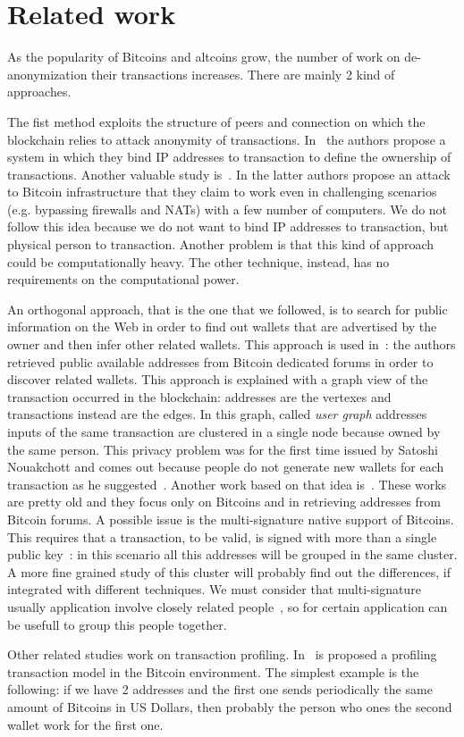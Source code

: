 \section{Related work}
As the popularity of Bitcoins and altcoins grow, the number of work on
de-anonymization their transactions increases.
There are mainly 2 kind of approaches.

The fist method exploits the structure of peers and connection on which the
blockchain relies to attack anonymity of transactions. In~\cite{anonBitcoin}
the authors propose a system in which they bind IP addresses to transaction to
define the ownership of transactions. Another valuable study
is~\cite{deanonP2P}. In the latter authors propose an attack to Bitcoin
infrastructure that they claim to work even in challenging scenarios (e.g.
bypassing firewalls and NATs) with a few number of computers. We do not follow
this idea because we do not want to bind IP addresses to transaction, but
physical person to transaction. Another problem is that this kind of approach
could be computationally heavy. The other technique, instead, has no
requirements on the computational power.

An orthogonal approach, that is the one that we followed, is to search for
public information on the Web in order to find out wallets that are advertised
by the owner and then infer other related wallets. This approach is used
in~\cite{anonAnalysis}: the authors retrieved public available addresses from
Bitcoin dedicated forums in order to discover related wallets. This approach is
explained with a graph view of the transaction occurred in the blockchain:
addresses are the vertexes and transactions instead are the edges. In this
graph, called \textit{user graph} addresses inputs of the same transaction are
clustered in a single node because owned by the same person. This privacy
problem was for the first time issued by Satoshi Nouakchott and comes out
because people do not generate new wallets for each transaction as he
suggested~\cite{satoshi}. Another work based on that idea is~\cite{fistful}.
These works are pretty old and they focus only on Bitcoins and in retrieving
addresses from Bitcoin forums. A possible issue is the multi-signature native
support of Bitcoins. This requires that a transaction, to be valid, is signed
with more than a single public key~\cite{multisignature}: in this scenario all
this addresses will be grouped in the same cluster. A more fine grained study
of this cluster will probably find out the differences, if integrated with
different techniques. We must consider that multi-signature usually application
involve closely related people~\cite{multisignaturebitcoinwiki}, so for certain
application can be usefull to group this people together.

Other related studies work on transaction profiling. In~\cite{fullDiscl} is
proposed a profiling transaction model in the Bitcoin environment. The
simplest example is the following: if we have 2 addresses and the first one
sends periodically the same amount of Bitcoins in US Dollars, then probably
the person who ones the second wallet work for the first one.
